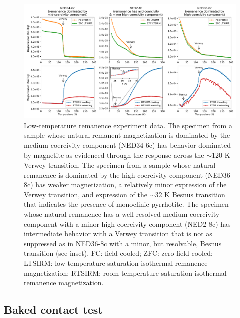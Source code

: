 \documentclass[draft]{agujournal2019}
\begin{document}
\begin{figure}[!ht]
\noindent\includegraphics[width=\textwidth]{./figures/MPMS_data.pdf}
\caption{\small{Low-temperature remanence experiment data. The specimen from a sample whose natural remanent magnetization is dominated by the medium-coercivity component (NED34-6c) has behavior dominated by magnetite as evidenced through the response across the $\sim$120 K Verwey transition. The specimen from a sample whose natural remanence is dominated by the high-coercivity component (NED36-8c) has weaker magnetization, a relatively minor expression of the Verwey transition, and expression of the $\sim$32 K Besnus transition that indicates the presence of monoclinic pyrrhotite. The specimen whose natural remanence has a well-resolved medium-coercivity component with a minor high-coercivity component (NED2-8c) has intermediate behavior with a Verwey transition that is not as suppressed as in NED36-8c with a minor, but resolvable, Besnus transition (see inset). FC: field-cooled; ZFC: zero-field-cooled; LTSIRM: low-temperature saturation isothermal remanence magnetization; RTSIRM: room-temperature saturation isothermal remanence magnetization.}}
\label{fig:MPMS_data}
\end{figure}

\subsection{Baked contact test}
\end{document}
